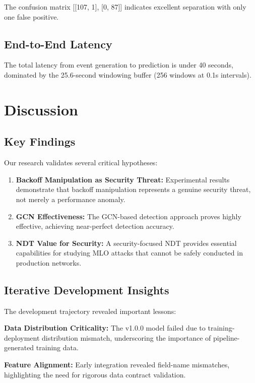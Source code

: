 \documentclass[12pt,a4paper]{article}
\begin{document}
The confusion matrix [[107, 1], [0, 87]] indicates excellent separation with only one false positive.

\subsection{End-to-End Latency}

The total latency from event generation to prediction is under 40 seconds, dominated by the 25.6-second windowing buffer (256 windows at 0.1s intervals).

\section{Discussion}

\subsection{Key Findings}

Our research validates several critical hypotheses:

\begin{enumerate}
    \item \textbf{Backoff Manipulation as Security Threat:} Experimental results demonstrate that backoff manipulation represents a genuine security threat, not merely a performance anomaly.
    \item \textbf{GCN Effectiveness:} The GCN-based detection approach proves highly effective, achieving near-perfect detection accuracy.
    \item \textbf{NDT Value for Security:} A security-focused NDT provides essential capabilities for studying MLO attacks that cannot be safely conducted in production networks.
\end{enumerate}

\subsection{Iterative Development Insights}

The development trajectory revealed important lessons:

\textbf{Data Distribution Criticality:} The v1.0.0 model failed due to training-deployment distribution mismatch, underscoring the importance of pipeline-generated training data.

\textbf{Feature Alignment:} Early integration revealed field-name mismatches, highlighting the need for rigorous data contract validation.
\end{document}
